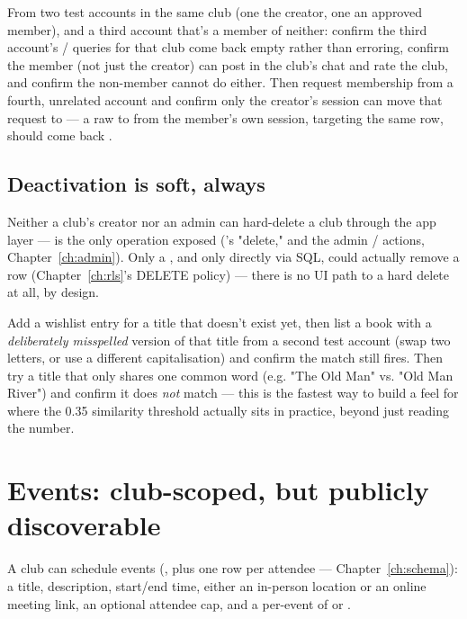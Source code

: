 \begin{olktask}
From two test accounts in the same club (one the creator, one an approved member), and a third account that's a member of neither: confirm the third account's / queries for that club come back empty rather than erroring, confirm the member (not just the creator) can post in the club's chat and rate the club, and confirm the non-member cannot do either. Then request membership from a fourth, unrelated account and confirm only the creator's session can move that request to  — a raw  to  from the member's own session, targeting the same row, should come back .
\end{olktask}

\subsection*{Deactivation is soft, always}

Neither a club's creator nor an admin can hard-delete a club through the app layer —  is the only operation exposed ('s "delete," and the admin / actions, Chapter~\ref{ch:admin}). Only a , and only directly via SQL, could actually remove a  row (Chapter~\ref{ch:rls}'s DELETE policy) — there is no UI path to a hard delete at all, by design.

\begin{olktask}
Add a wishlist entry for a title that doesn't exist yet, then list a book with a \emph{deliberately misspelled} version of that title from a second test account (swap two letters, or use a different capitalisation) and confirm the match still fires. Then try a title that only shares one common word (e.g. "The Old Man" vs. "Old Man River") and confirm it does \emph{not} match — this is the fastest way to build a feel for where the 0.35 similarity threshold actually sits in practice, beyond just reading the number.
\end{olktask}

\section{Events: club-scoped, but publicly discoverable}

A club can schedule events (, plus one  row per attendee — Chapter~\ref{ch:schema}): a title, description, start/end time, either an in-person location or an online meeting link, an optional attendee cap, and a per-event  of  or .

